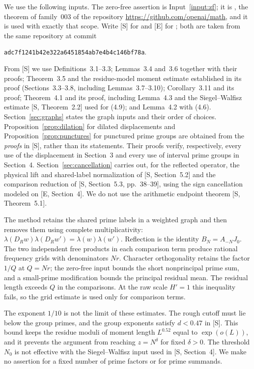 \documentclass[11pt]{article}
\theoremstyle{definition}
\theoremstyle{remark}
\begin{document}
We use the following inputs. The zero-free assertion is
Input~\ref{input:zf}; it is \cite[Theorem~1.1]{OpenAIQ78}, the theorem
of family~003 of the repository \url{https://github.com/openai/math},
and it is used with exactly that scope. Write [S] for
\cite{WeightedGraphs} and [E] for \cite{EvenParity}; both are taken
from the same repository at commit
\begin{center}\small
\nolinkurl{adc7f1241b42e322a6451854ab7e4b4c146bf78a}.
\end{center}
From [S] we use Definitions~3.1--3.3; Lemmas~3.4 and~3.6 together
with their proofs; Theorem~3.5 and the residue-model moment estimate
established in its proof (Sections~3.3--3.8, including
Lemmas~3.7--3.10); Corollary~3.11 and its proof; Theorem~4.1 and its
proof, including Lemma~4.3 and the Siegel--Walfisz estimate
[S, Theorem~2.2] used for (4.9); and Lemma~4.2 with (4.6).
Section~\ref{sec:graphs} states the graph inputs and their
order of choices. Proposition~\ref{prop:dilation} for dilated
displacements and Proposition~\ref{prop:punctures} for punctured prime
groups are obtained from the \emph{proofs} in [S], rather than its
statements. Their proofs verify, respectively, every use of the
displacement in Section~3 and every use of interval prime groups in
Section~4. Section~\ref{sec:cancellation} carries out, for the
reflected operator, the physical lift and shared-label normalization
of [S, Section~5.2] and the comparison reduction of [S, Section~5.3,
pp.~38--39], using the sign cancellation modeled on [E, Section~4].
We do not use the arithmetic endpoint theorem [S, Theorem~5.1].

The method retains the shared prime labels in a weighted graph and
then removes them using complete multiplicativity:
$\lambda(D_Rw)\lambda(D_Rw')=\lambda(w)\lambda(w')$.
Reflection is the identity $B_N=A_{-N}J_0$.
The two independent free products in each comparison term produce
rational frequency grids with denominators $Nr$. Character
orthogonality retains the factor $1/Q$ at $Q=Nr$; the zero-free input
bounds the short nonprincipal prime sum, and a small-prime modification
bounds the principal residual mean. The residual length exceeds $Q$
in the comparisons. At the raw scale $H'=1$ this inequality fails, so
the grid estimate is used only for comparison terms.

The exponent $1/10$ is not the limit of these estimates. The rough
cutoff must lie below the group primes, and the group exponents satisfy
$d<0.47$ in [S]. This bound keeps the residue moduli of moment length
$L^{0.52}$ equal to $\exp(o(L))$, and it prevents the argument from
reaching $z=N^\delta$ for fixed $\delta>0$.
The threshold $N_0$ is not effective with the Siegel--Walfisz input
used in [S, Section~4]. We make no assertion for a fixed number of
prime factors or for prime summands.
\end{document}
